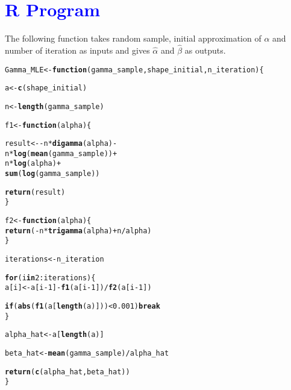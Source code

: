 \documentclass[11pt, a4paper]{article}\usepackage[]{graphicx}\usepackage[]{xcolor}
\makeatletter
\newcommand{\hlnum}[1]{\textcolor[rgb]{0.686,0.059,0.569}{#1}}%
\newcommand{\hlopt}[1]{\textcolor[rgb]{0,0,0}{#1}}%
\newcommand{\hldef}[1]{\textcolor[rgb]{0.345,0.345,0.345}{#1}}%
\newcommand{\hlkwa}[1]{\textcolor[rgb]{0.161,0.373,0.58}{\textbf{#1}}}%
\newcommand{\hlkwb}[1]{\textcolor[rgb]{0.69,0.353,0.396}{#1}}%
\newcommand{\hlkwc}[1]{\textcolor[rgb]{0.333,0.667,0.333}{#1}}%
\newcommand{\hlkwd}[1]{\textcolor[rgb]{0.737,0.353,0.396}{\textbf{#1}}}%
\newenvironment{kframe}{%
 \def\at@end@of@kframe{}%
 \ifinner\ifhmode%
  \def\at@end@of@kframe{\end{minipage}}%
  \begin{minipage}{\columnwidth}%
 \fi\fi%
 \def\FrameCommand##1{\hskip\@totalleftmargin \hskip-\fboxsep
 \colorbox{shadecolor}{##1}\hskip-\fboxsep
     \hskip-\linewidth \hskip-\@totalleftmargin \hskip\columnwidth}%
 \MakeFramed {\advance\hsize-\width
   \@totalleftmargin\z@ \linewidth\hsize
   \@setminipage}}%
 {\par\unskip\endMakeFramed%
 \at@end@of@kframe}
\newenvironment{knitrout}{}{} %
\makeatother
\begin{document}
\section*{\faArrowAltCircleRight[regular] \textcolor{blue}{R Program}}

The following function takes random sample, initial approximation of $\alpha$ and number of iteration as inputs and gives $\hat{\alpha}$ and $\hat{\beta}$ as outputs.

\begin{knitrout}
\color{fgcolor}\begin{kframe}
\begin{alltt}
\hldef{Gamma_MLE} \hlkwb{<-} \hlkwa{function}\hldef{(}\hlkwc{gamma_sample}\hldef{,} \hlkwc{shape_initial}\hldef{,} \hlkwc{n_iteration}\hldef{)\{}

  \hldef{a} \hlkwb{<-} \hlkwd{c}\hldef{(shape_initial)}

  \hldef{n} \hlkwb{<-} \hlkwd{length}\hldef{(gamma_sample)}

  \hldef{f1} \hlkwb{<-} \hlkwa{function}\hldef{(}\hlkwc{alpha}\hldef{)\{}

    \hldef{result} \hlkwb{<-} \hlopt{-} \hldef{n} \hlopt{*} \hlkwd{digamma}\hldef{(alpha)} \hlopt{-}
                \hldef{n} \hlopt{*} \hlkwd{log}\hldef{(}\hlkwd{mean}\hldef{(gamma_sample))} \hlopt{+}
                \hldef{n} \hlopt{*} \hlkwd{log}\hldef{(alpha)} \hlopt{+}
                \hlkwd{sum}\hldef{(}\hlkwd{log}\hldef{(gamma_sample))}

    \hlkwd{return}\hldef{(result)}
  \hldef{\}}

  \hldef{f2} \hlkwb{<-} \hlkwa{function}\hldef{(}\hlkwc{alpha}\hldef{)\{}
    \hlkwd{return}\hldef{(}\hlopt{-}\hldef{n} \hlopt{*} \hlkwd{trigamma}\hldef{(alpha)} \hlopt{+} \hldef{n} \hlopt{/} \hldef{alpha)}
  \hldef{\}}

  \hldef{iterations} \hlkwb{<-} \hldef{n_iteration}

  \hlkwa{for} \hldef{(i} \hlkwa{in} \hlnum{2}\hlopt{:}\hldef{iterations) \{}
    \hldef{a[i]} \hlkwb{<-} \hldef{a[i}\hlopt{-}\hlnum{1}\hldef{]} \hlopt{-} \hlkwd{f1}\hldef{(a[i}\hlopt{-}\hlnum{1}\hldef{])} \hlopt{/} \hlkwd{f2}\hldef{(a[i}\hlopt{-}\hlnum{1}\hldef{])}

    \hlkwa{if}\hldef{(}\hlkwd{abs}\hldef{(}\hlkwd{f1}\hldef{(a[}\hlkwd{length}\hldef{(a)]))} \hlopt{<} \hlnum{0.001}\hldef{)} \hlkwa{break}
  \hldef{\}}

  \hldef{alpha_hat} \hlkwb{<-} \hldef{a[}\hlkwd{length}\hldef{(a)]}

  \hldef{beta_hat} \hlkwb{<-} \hlkwd{mean}\hldef{(gamma_sample)} \hlopt{/} \hldef{alpha_hat}

  \hlkwd{return}\hldef{(}\hlkwd{c}\hldef{(alpha_hat, beta_hat))}
\hldef{\}}
\end{alltt}
\end{kframe}
\end{knitrout}
\end{document}
